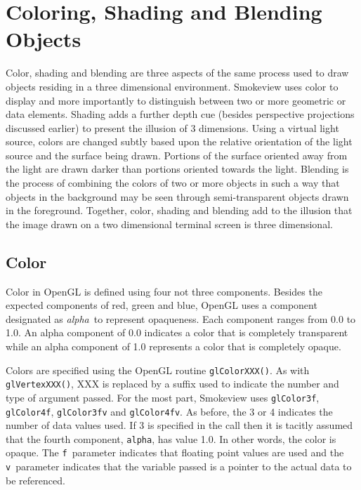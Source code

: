 \documentclass[11pt,twoside]{book}
\begin{document}
\chapter{Coloring, Shading and Blending Objects}
Color, shading and blending are three aspects of the same process used to draw objects residing in a three dimensional environment.  Smokeview uses color to display and more importantly to distinguish between two or more geometric or data elements.  Shading adds a further depth cue (besides perspective projections discussed earlier) to present the illusion of 3 dimensions.  Using a virtual light source, colors are changed subtly based upon the relative orientation of the light source and the surface being drawn.  Portions of the surface oriented away from the light are drawn darker than portions oriented towards the light.  Blending is the process of combining the colors of two or more objects in such a way that objects in the background may be seen through semi-transparent objects drawn in the foreground.  Together, color, shading and blending add to the illusion that the image drawn on a two dimensional terminal screen is three dimensional.

\section{Color}
Color in OpenGL is defined using four not three components.  Besides the expected components
of red, green and blue, OpenGL uses a component designated as {\em alpha}\ to represent opaqueness.
Each component ranges from 0.0 to 1.0. An alpha component of
0.0 indicates a color that is completely transparent while an alpha component of 1.0
represents a color that is completely opaque.

Colors are specified using the OpenGL routine {\tt glColorXXX()}.  As with {\tt glVertexXXX()}, XXX is replaced by a suffix used to indicate the number and type of argument passed.  For the most part, Smokeview uses {\tt glColor3f}, {\tt glColor4f}, {\tt glColor3fv} and {\tt glColor4fv}.  As before, the 3 or 4 indicates the number of data values used.  If 3 is specified in the call then it is tacitly assumed that the fourth component, {\tt alpha}, has value 1.0.  In other words, the color is opaque.  The {\tt f}\ parameter indicates that floating point values are used and the {\tt v}\ parameter indicates that the variable passed is a pointer to the actual data to be referenced.
\end{document}
